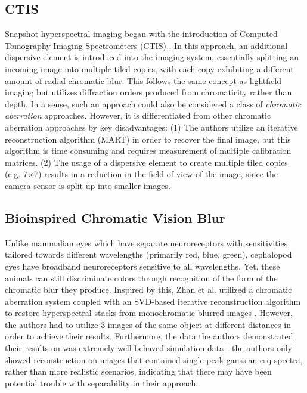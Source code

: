 \documentclass{article}
\begin{document}
\subsection{CTIS}
Snapshot hyperspectral imaging began with the introduction of Computed Tomography Imaging Spectrometers (CTIS) \cite{FORD2001986}. In this approach, an additional dispersive element is introduced into the imaging system, essentially splitting an incoming image into multiple tiled copies, with each copy exhibiting a different amount of radial chromatic blur. This follows the same concept as lightfield imaging \cite{guo2019fourier}\cite{broxton2013wave} but utilizes diffraction orders produced from chromaticity rather than depth. In a sense, such an approach could also be considered a class of \textit{chromatic aberration} approaches. However, it is differentiated from other chromatic aberration approaches by key disadvantages: (1) The authors utilize an iterative reconstruction algorithm (MART) in order to recover the final image, but this algorithm is time consuming and requires measurement of multiple calibration matrices. (2) The usage of a dispersive element to create multiple tiled copies (e.g. 7×7) results in a reduction in the field of view of the image, since the camera sensor is split up into smaller images.

\subsection{Bioinspired Chromatic Vision Blur}
Unlike mammalian eyes which have separate neuroreceptors with sensitivities tailored towards different wavelengths (primarily red, blue, green), cephalopod eyes have broadband neuroreceptors sensitive to all wavelengths. Yet, these animals can still discriminate colors through recognition of the form of the chromatic blur they produce. Inspired by this, Zhan et al. utilized a chromatic aberration system coupled with an SVD-based iterative reconstruction algorithm to restore hyperspectral stacks from monochromatic blurred images \cite{zhan2019hyperspectral}. However, the authors had to utilize 3 images of the same object at different distances in order to achieve their results. Furthermore, the data the authors demonstrated their results on was extremely well-behaved simulation data - the authors only showed reconstruction on images that contained single-peak gaussian-esq spectra, rather than more realistic scenarios, indicating that there may have been potential trouble with separability in their approach.
\end{document}
